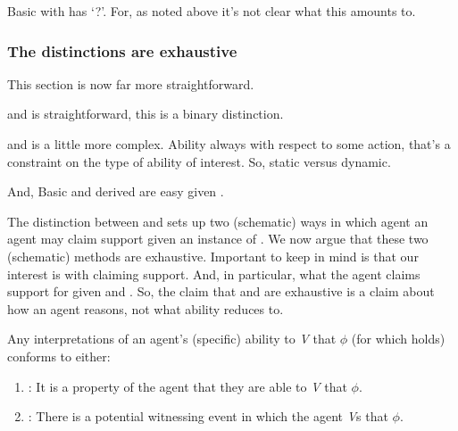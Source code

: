 \begin{note}
  Basic \AR{} with \ur{} has `?'.
  For, as noted above it's not clear what this amounts to.
\end{note}

\subsubsection{The distinctions are exhaustive}
\label{sec:ar-wr-are}

\begin{note}
  \color{red}
  This section is now far more straightforward.

  \nr{} and \ur{} is straightforward, this is a binary distinction.

  \AR{} and \WR{} is a little more complex.
  Ability always with respect to some action, that's a constraint on the type of ability of interest.
  So, static versus dynamic.


  And, Basic and derived are easy given \AR{}.
\end{note}

\begin{note}
  The distinction between \AR{} and \WR{} sets up two (schematic) ways in which agent an agent may claim support given an instance of .
  We now argue that these two (schematic) methods are exhaustive.
  {
    \color{red}
    Important to keep in mind is that our interest is with claiming support.
    And, in particular, what the agent claims support for given \AR{} and \WR{}.
    So, the claim that \AR{} and \WR{} are exhaustive is a claim about how an agent reasons, not what ability reduces to.
  }
\end{note}

\begin{note}[Exhaustive]
  \begin{proposition}\label{prop:WR-and-AR-exhaustive}\label{either-AR-or-WR}
    Any interpretations of an agent's (specific) ability to \emph{V} that \(\phi\) (for which  holds) conforms to either:
    \begin{enumerate}
    \item \AR{}: It is a property of the agent that they are able to \emph{V} that \(\phi\).
    \item \WR{}: There is a potential witnessing event in which the agent \emph{V}s that \(\phi\).
    \end{enumerate}
    \vspace{-\topsep}\vspace{-\topsep}
  \end{proposition}
\end{note}

